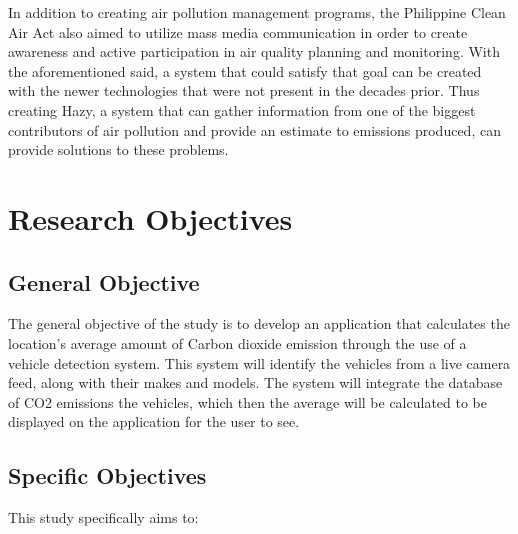 In addition to creating air pollution management programs, the Philippine Clean Air Act also aimed to utilize mass media communication in order to create awareness and active participation in air quality planning and monitoring. With the aforementioned said, a system that could satisfy that goal can be created with the newer technologies that were not present in the decades prior. Thus creating Hazy, a system that can gather information from one of the biggest contributors of air pollution and provide an estimate to emissions produced, can provide solutions to these problems. 


\section{Research Objectives}
\label{sec:researchobjectives}

\subsection{General Objective}
\label{sec:generalobjective}


The general objective of the study is to develop an application that calculates the location’s average amount of Carbon dioxide emission through the use of a vehicle detection system. This system will identify the vehicles from a live camera feed, along with their makes and models. The system will integrate the database of CO2 emissions the vehicles, which then the average will be calculated to be displayed on the application for the user to see.



\subsection{Specific Objectives}
\label{sec:specificobjectives}

%
%
This study specifically aims to:


